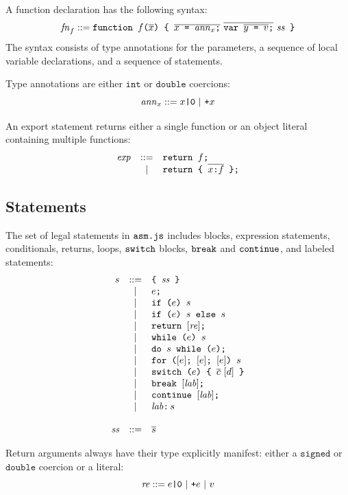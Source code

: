 \documentclass{article}
\newcommand{\seq}[1]{\overline{{#1}}}
\newcommand{\mathjs}[1]{\mbox{\texttt{{#1}}}}
\newcommand{\return}[1]{\mathjs{return }{#1}\mathjs{;}}
\newcommand{\fun}[3]{\mathjs{function }{#1}\mathjs{(}{#2}\mathjs{) \char123{} }{#3}\mathjs{ \char125{}}}
\newcommand{\var}[1]{\mathjs{var }{#1}\mathjs{;}}
\newcommand{\while}[2]{\mathjs{while (}{#1}\mathjs{) }{#2}}
\newcommand{\dowhile}[2]{\mathjs{do }{#1}\mathjs{ while (}{#2}\mathjs{);}}
\newcommand{\for}[4]{\mathjs{for (}{#1}\mathjs{; }{#2}\mathjs{; }{#3}\mathjs{) }{#4}}
\newcommand{\switch}[2]{\mathjs{switch (}{#1}\mathjs{) \char123{} }{#2}\mathjs{ \char125{}}}
\newcommand{\brkl}[1]{\mathjs{break }{#1}\mathjs{;}}
\newcommand{\contl}[1]{\mathjs{continue }{#1}\mathjs{;}}
\newcommand{\lab}[2]{{#1}\mathjs{:}\,{#2}}
\newcommand{\ifone}[2]{\mathjs{if (}{#1}\mathjs{) }{#2}}
\newcommand{\iftwo}[3]{\mathjs{if (}{#1}\mathjs{) }{#2}\mathjs{ else }{#3}}
\newcommand{\block}[1]{\mathjs{\char123{} }{#1}\mathjs{ \char125{}}}
\newcommand{\signed}{\mathtt{signed}}
\newcommand{\double}{\mathtt{double}}
\newcommand{\todouble}[1]{\mathjs{+}{#1}}
\renewcommand{\int}{\mathtt{int}}
\begin{document}
A function declaration has the following syntax:
\[
\mathit{fn}_f ::= \fun{f}{\seq{x}}{\seq{x\mathjs{ = }\mathit{ann}_x\mathjs{;}}\ \seq{\var{\seq{y\mathjs{ = }v}}}\ \mathit{ss}}
\]
The syntax consists of type annotations for the parameters, a sequence
of local variable declarations, and a sequence of statements.

Type annotations are either $\int$ or $\double$ coercions:
\[
\mathit{ann}_x ::= x\mathjs{|0} ~|~ \todouble{x}
\]

An export statement returns either a single function or an object
literal containing multiple functions:
\[
\begin{array}{rcl}
\mathit{exp}    & ::= & \return{f} \\
                &  |  & \return{\mathjs{\char123{} } \seq{x \mathjs{:} f} \mathjs{ \char125{}}} \\
\end{array}
\]

\subsection{Statements}

The set of legal statements in $\mathjs{asm.js}$ includes blocks,
expression statements, conditionals, returns, loops, $\mathjs{switch}$
blocks, $\mathjs{break}$ and $\mathjs{continue}$, and labeled
statements:
\[
\begin{array}{rcl}
s & ::= & \block{\mathit{ss}} \\
  &  |  & e\mathjs{;} \\
  &  |  & \ifone{e}{s} \\
  &  |  & \iftwo{e}{s}{s} \\
  &  |  & \return{[\mathit{re}]} \\
  &  |  & \while{e}{s} \\
  &  |  & \dowhile{s}{e} \\
  &  |  & \for{[e]}{[e]}{[e]}{s} \\
  &  |  & \switch{e}{\seq{c}\ [d]} \\
  &  |  & \brkl{[\mathit{lab}]} \\
  &  |  & \contl{[\mathit{lab}]} \\
  &  |  & \lab{\mathit{lab}}{s} \\
\\
\mathit{ss} & ::= & \seq{s} \\
\end{array}
\]

Return arguments always have their type explicitly manifest: either a
$\signed$ or $\double$ coercion or a literal:
\[
\mathit{re} ::= e\mathjs{|0} ~|~ \todouble{e} ~|~ v
\]
\end{document}

